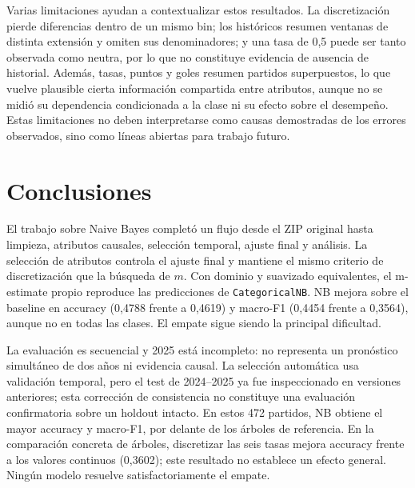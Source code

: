 \documentclass[conference]{IEEEtran}
\begin{document}
Varias limitaciones ayudan a contextualizar estos resultados. La discretización pierde diferencias dentro de un mismo bin; los históricos resumen ventanas de distinta extensión y omiten sus denominadores; y una tasa de 0,5 puede ser tanto observada como neutra, por lo que no constituye evidencia de ausencia de historial. Además, tasas, puntos y goles resumen partidos superpuestos, lo que vuelve plausible cierta información compartida entre atributos, aunque no se midió su dependencia condicionada a la clase ni su efecto sobre el desempeño. Estas limitaciones no deben interpretarse como causas demostradas de los errores observados, sino como líneas abiertas para trabajo futuro.

\section{Conclusiones}
El trabajo sobre Naive Bayes completó un flujo desde el ZIP original hasta limpieza, atributos causales, selección temporal, ajuste final y análisis. La selección de atributos controla el ajuste final y mantiene el mismo criterio de discretización que la búsqueda de $m$. Con dominio y suavizado equivalentes, el m-estimate propio reproduce las predicciones de \texttt{CategoricalNB}. NB mejora sobre el baseline en accuracy (0,4788 frente a 0,4619) y macro-F1 (0,4454 frente a 0,3564), aunque no en todas las clases. El empate sigue siendo la principal dificultad.

La evaluación es secuencial y 2025 está incompleto: no representa un pronóstico simultáneo de dos años ni evidencia causal. La selección automática usa validación temporal, pero el test de 2024--2025 ya fue inspeccionado en versiones anteriores; esta corrección de consistencia no constituye una evaluación confirmatoria sobre un holdout intacto. En estos 472 partidos, NB obtiene el mayor accuracy y macro-F1, por delante de los árboles de referencia. En la comparación concreta de árboles, discretizar las seis tasas mejora accuracy frente a los valores continuos (0,3602); este resultado no establece un efecto general. Ningún modelo resuelve satisfactoriamente el empate.
\end{document}
